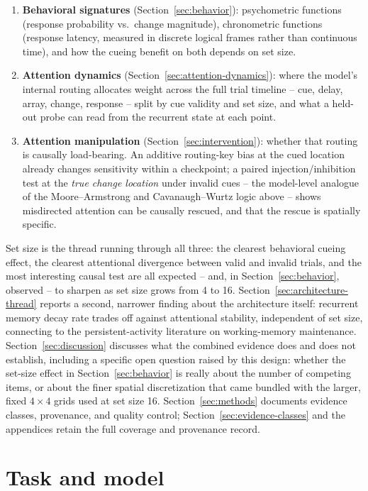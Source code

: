 \documentclass[11pt,a4paper]{article}
\begin{document}
\begin{enumerate}
\item \textbf{Behavioral signatures} (Section~\ref{sec:behavior}): psychometric functions (response probability vs.\ change magnitude), chronometric functions (response latency, measured in discrete logical frames rather than continuous time), and how the cueing benefit on both depends on set size.
\item \textbf{Attention dynamics} (Section~\ref{sec:attention-dynamics}): where the model's internal routing allocates weight across the full trial timeline -- cue, delay, array, change, response -- split by cue validity and set size, and what a held-out probe can read from the recurrent state at each point.
\item \textbf{Attention manipulation} (Section~\ref{sec:intervention}): whether that routing is causally load-bearing. An additive routing-key bias at the cued location already changes sensitivity within a checkpoint; a paired injection/inhibition test at the \emph{true change location} under invalid cues -- the model-level analogue of the Moore--Armstrong and Cavanaugh--Wurtz logic above -- shows misdirected attention can be causally rescued, and that the rescue is spatially specific.
\end{enumerate}

Set size is the thread running through all three: the clearest behavioral cueing effect, the clearest attentional divergence between valid and invalid trials, and the most interesting causal test are all expected -- and, in Section~\ref{sec:behavior}, observed -- to sharpen as set size grows from 4 to 16. Section~\ref{sec:architecture-thread} reports a second, narrower finding about the architecture itself: recurrent memory decay rate trades off against attentional stability, independent of set size, connecting to the persistent-activity literature on working-memory maintenance. Section~\ref{sec:discussion} discusses what the combined evidence does and does not establish, including a specific open question raised by this design: whether the set-size effect in Section~\ref{sec:behavior} is really about the number of competing items, or about the finer spatial discretization that came bundled with the larger, fixed $4\times4$ grids used at set size 16. Section~\ref{sec:methods} documents evidence classes, provenance, and quality control; Section~\ref{sec:evidence-classes} and the appendices retain the full coverage and provenance record.

\section{Task and model}\label{sec:task-model}
\end{document}

